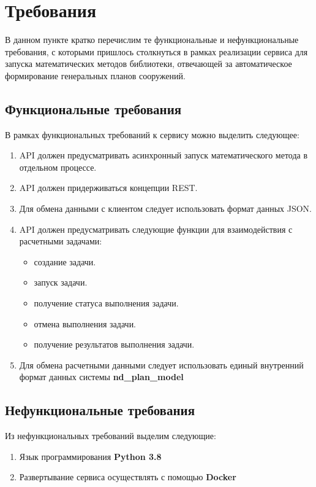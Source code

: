 \section*{\Large{Требования}}

В данном пункте кратко перечислим те функциональные и нефункциональные требования, с которыми пришлось столкнуться
в рамках реализации сервиса для запуска математических методов библиотеки, отвечающей за автоматическое формирование
генеральных планов сооружений.

\subsection*{\large{Функциональные требования}}

В рамках функциональных требований к сервису можно выделить следующее:
\begin{enumerate}
    \item API должен предусматривать асинхронный запуск математического метода в отдельном процессе.
    \item API должен придерживаться концепции REST.
    \item Для обмена данными с клиентом следует использовать формат данных JSON.
    \item API должен предусматривать следующие функции для взаимодействия с расчетными задачами:
    \begin{itemize}
        \item создание задачи.
        \item запуск задачи.
        \item получение статуса выполнения задачи.
        \item отмена выполнения задачи.
        \item получение результатов выполнения задачи.
    \end{itemize}
    \item Для обмена расчетными данными следует использовать единый внутренний формат данных системы \textbf{nd\_plan\_model}

\end{enumerate}

\subsection*{\large{Нефункциональные требования}}

Из нефункциональных требований выделим следующие:
\begin{enumerate}
    \item Язык программирования \textbf{Python 3.8}
    \item Развертывание сервиса осуществлять с помощью \textbf{Docker}
\end{enumerate}
